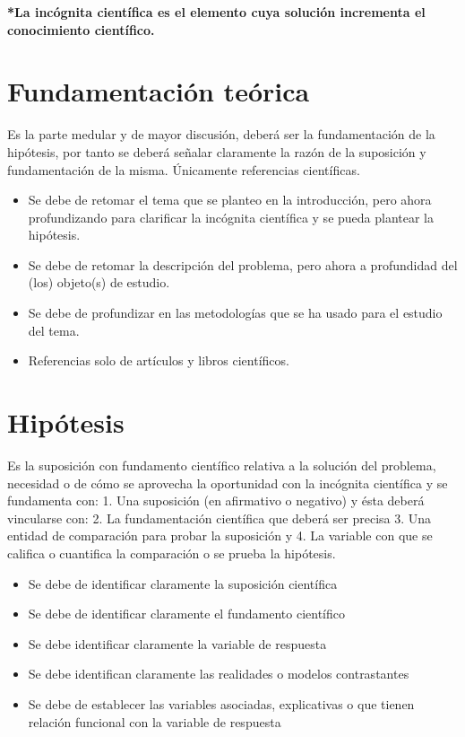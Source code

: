     \textbf{*La incógnita científica es el elemento cuya solución incrementa el conocimiento científico.}
    \section{Fundamentación teórica}
    
    Es la parte medular y de mayor discusión, deberá ser la fundamentación de la hipótesis, por tanto se deberá señalar claramente la razón de la suposición y fundamentación de la misma. Únicamente referencias científicas.
    \begin{itemize}
        \item Se debe de retomar el tema que se planteo en la introducción, pero ahora profundizando para clarificar la incógnita científica y se pueda plantear la hipótesis.
        \item Se debe de retomar la descripción del problema, pero ahora a profundidad del (los) objeto(s) de estudio. 
        \item Se debe de profundizar en las metodologías que se ha usado para el estudio del tema.
        \item Referencias solo de artículos y libros científicos.
    \end{itemize}
    \section{Hipótesis}
    
    Es la suposición con fundamento científico relativa a la solución del problema, necesidad o de cómo se aprovecha la oportunidad con la incógnita científica y se fundamenta con: 1. Una suposición (en afirmativo o negativo) y ésta deberá vincularse con:
    2. La fundamentación científica que deberá ser precisa 3. Una entidad de comparación para probar la suposición y
    4. La variable con que se califica o cuantifica la comparación o se prueba la hipótesis.
    
    \begin{itemize}
        \item Se debe de identificar claramente la suposición científica
        \item Se debe de identificar claramente el fundamento científico
        \item Se debe identificar claramente la variable de respuesta
        \item Se debe identifican claramente las realidades o modelos contrastantes
        \item Se debe de establecer las variables asociadas, explicativas o que tienen relación funcional con la variable de respuesta
    \end{itemize}
